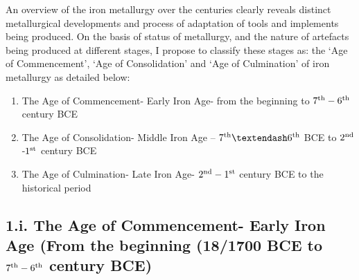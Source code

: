 An overview of the iron metallurgy over the centuries clearly reveals distinct metallurgical developments and process of adaptation of tools and implements being produced. On the basis of status of metallurgy, and the nature of artefacts being produced at different stages, I propose to classify these stages as: the ‘Age of Commencement’, ‘Age of Consolidation’ and ‘Age of Culmination’ of iron metallurgy as detailed below: 
\begin{enumerate}
\item The Age of Commencement- Early Iron Age- from the beginning to $7^{\rm th} -6^{\rm th}$ century BCE
\item The Age of Consolidation- Middle Iron Age – $7^{\rm th} – 6^{\rm th}$ BCE to $2^{\rm nd}$ -$1^{\rm st}$ century BCE
\item The Age of Culmination- Late Iron Age- $2^{\rm nd} -1^{\rm st}$ century BCE to the historical period
\end{enumerate}

\vspace{-.5cm}

\subsection*{1.i. The Age of Commencement- Early Iron Age (From the beginning (18/1700 BCE to $7^{\rm th} -6^{\rm th}$ century BCE)}\label{chapter4-subsection-1}

